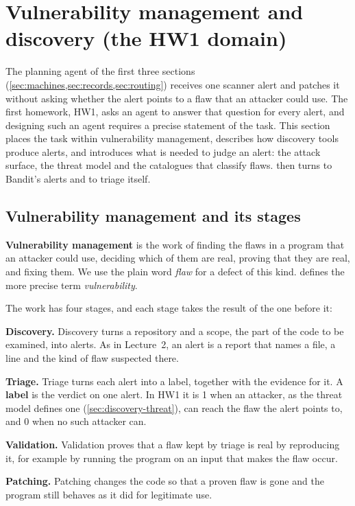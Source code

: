 \section{Vulnerability management and discovery (the HW1 domain)}
\label{sec:discovery}

The planning agent of the first three sections (\cref{sec:machines,sec:records,sec:routing})
receives one scanner alert and patches it without asking whether the alert points to a flaw that an
attacker could use. The first homework, HW1, asks an agent to answer that question for every alert,
and designing such an agent requires a precise statement of the task. This section places the task
within vulnerability management, describes how discovery tools produce alerts, and introduces what
is needed to judge an alert: the attack surface, the threat model and the catalogues that classify
flaws.  then turns to Bandit's alerts and to triage itself.

\subsection{Vulnerability management and its stages}
\label{sec:discovery-stages}

\textbf{Vulnerability management} is the work of finding the flaws in a program that an attacker
could use, deciding which of them are real, proving that they are real, and fixing them. We use the
plain word \emph{flaw} for a defect of this kind.  defines the more precise term
\emph{vulnerability}.

The work has four stages, and each stage takes the result of the one before it:
\bi
\item \textbf{Discovery.} Discovery turns a repository and a scope, the part of the code to be
examined, into alerts. As in Lecture~2, an alert is a report that names a file, a line and the kind
of flaw suspected there.
\item \textbf{Triage.} Triage turns each alert into a label, together with the evidence for it. A
\textbf{label} is the verdict on one alert. In HW1 it is 1 when an attacker, as the threat model
defines one (\cref{sec:discovery-threat}), can reach the flaw the alert points to, and 0 when no
such attacker can.
\item \textbf{Validation.} Validation proves that a flaw kept by triage is real by reproducing it,
for example by running the program on an input that makes the flaw occur.
\item \textbf{Patching.} Patching changes the code so that a proven flaw is gone and the program
still behaves as it did for legitimate use.
\ei

